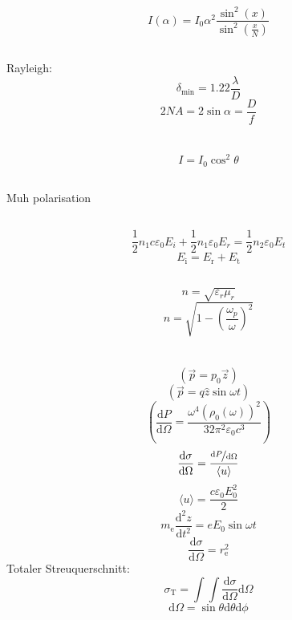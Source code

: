\documentclass[12pt]{report}
\newcommand{\vepsilon}{\varepsilon}
\newcommand{\dd}{\mathrm{d}}
\begin{document}
\[I(\alpha)=I_0\alpha^2\frac{\sin^2(x)}{\sin^2\left(\frac{x}{N}\right)}\]

\subsection{}

Rayleigh:
\[\delta_\mathrm{min}=1.22\frac{\lambda}{D}\]
\[2NA=2\sin\alpha=\frac{D}{f}\]

\subsection{}

\section{}

\subsection{}

\[I=I_0\cos^2\theta\]

\subsection{}
Muh polarisation

\subsection{}

\[\frac{1}{2}n_1c\vepsilon_0E_i+\frac{1}{2}n_1\vepsilon_0E_r=\frac{1}{2}n_2\vepsilon_0E_t\]
\[E_\mathrm{i}=E_\mathrm{r}+E_\mathrm{t}\]

\subsection{}

\[n=\sqrt{\vepsilon_r\mu_r}\]
\[n=\sqrt{1-\left(\frac{\omega_p}{\omega}\right)^2}\]

\section{}

\subsection{}

\[(\vec{p}=p_0\vec{z})\]
\[(\vec{p}=q\hat{z}\sin\omega t)\]
\[\left(\frac{\dd P}{\dd\Omega}=\frac{\omega^4(\rho_0(\omega))^2}{32\pi^2\vepsilon_0c^3}\right)\]
\[\frac{\dd\sigma}{\dd\Omega}=\frac{\nicefrac{\dd P}{\dd\Omega}}{\langle u\rangle}\]
\[\langle u\rangle=\frac{c\vepsilon_0E_0^2}{2}\]
\[m_\mathrm{e}\frac{\dd^2z}{\dd t^2}=eE_0\sin\omega t\]
\[\frac{\dd\sigma}{\dd\Omega}=r_\mathrm{e}^2\]
Totaler Streuquerschnitt:
\[\sigma_\mathrm{T}=\int\int\frac{\dd\sigma}{\dd\Omega}\dd\Omega\]
\[\dd\Omega=\sin\theta\dd\theta\dd\phi\]
\end{document}
